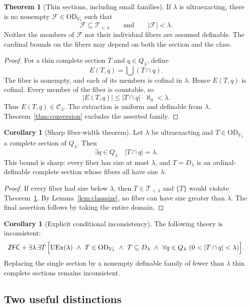 \documentclass[11pt,letterpaper]{article}
\theoremstyle{definition}
\newtheorem{theorem}[definition]{Theorem}
\newtheorem{corollary}[definition]{Corollary}
\numberwithin{equation}{section}
\newcommand{\ZFC}{\mathsf{ZFC}}
\newcommand{\OD}{\mathrm{OD}}
\newcommand{\UEx}{\operatorname{UEx}}
\newcommand{\D}{D_\lambda}
\newcommand{\Q}{Q_\lambda}
\newcommand{\C}{\mathcal C_\lambda}
\newcommand{\FF}{\mathcal F}
\newcommand{\Thin}{\mathcal T_{<\lambda}}
\begin{document}
\begin{theorem}[Thin sections, including small families]\label{thm:thin}
If $\lambda$ is ultraexacting, there is no nonempty $\FF\in\OD_{V_\lambda}$ such that
\[
 \FF\subseteq\Thin\qquad\text{and}\qquad |\FF|<\lambda.
\]
Neither the members of $\FF$ nor their individual fibers are assumed definable. The cardinal bounds on the fibers may depend on both the section and the class.
\end{theorem}
\begin{proof}
For a thin complete section $T$ and $q\in\Q$, define
\[
 E(T,q)=\bigcup(T\cap q).
\]
The fiber is nonempty, and each of its members is cofinal in $\lambda$. Hence $E(T,q)$ is cofinal. Every member of the fiber is countable, so
\[
 |E(T,q)|\le |T\cap q|\cdot\aleph_0<\lambda.
\]
Thus $E(T,q)\in\C$. The extraction is uniform and definable from $\lambda$. Theorem~\ref{thm:conversion} excludes the asserted family.
\end{proof}

\begin{corollary}[Sharp fiber-width theorem]\label{cor:sharp}
Let $\lambda$ be ultraexacting and $T\in\OD_{V_\lambda}$ a complete section of $\Q$. Then
\begin{equation}\label{eq:sharp}
 \exists q\in\Q\quad |T\cap q|=\lambda.
\end{equation}
This bound is sharp: every fiber has size at most $\lambda$, and $T=\D$ is an ordinal-definable complete section whose fibers all have size $\lambda$.
\end{corollary}
\begin{proof}
If every fiber had size below $\lambda$, then $T\in\Thin$ and $\{T\}$ would violate Theorem~\ref{thm:thin}. By Lemma~\ref{lem:classsize}, no fiber can have size greater than $\lambda$. The final assertion follows by taking the entire domain.
\end{proof}

\begin{corollary}[Explicit conditional inconsistency]\label{cor:thincons}
The following theory is inconsistent:
\[
 \ZFC+\exists\lambda\,\exists T\,\Bigl[
 \UEx(\lambda)\ \wedge\ T\in\OD_{V_\lambda}\ \wedge\ T\subseteq\D
 \ \wedge\ \forall q\in\Q\ (0<|T\cap q|<\lambda)\Bigr].
\]
Replacing the single section by a nonempty definable family of fewer than $\lambda$ thin complete sections remains inconsistent.
\end{corollary}

\subsection{Two useful distinctions}
\end{document}
